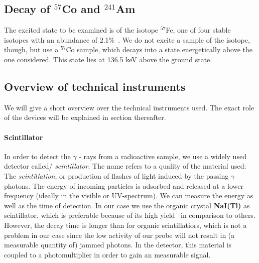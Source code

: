 \subsection{Decay of $^{57}$Co and $^{241}$Am}
The excited state to be examined is of the isotope $^{57}$Fe, one of four stable isotopes 
with an abundance of 2.1\%~\cite{nist}. We do not excite a sample of the isotope, though, but 
use a $^{57}$Co sample, which decays into a state energetically above the one considered. 
This state lies at 136.5 keV above the ground state. 



\subsection{Overview of technical instruments}
We will give a short overview over the technical instruments used. The exact role 
of the devices will be explained in section thereafter.
\label{sub:overview_of_technical_instruments}
\paragraph{Scintillator}
In order to detect the $\gamma$ - rays from a radioactive sample, we use a widely used detector called/
\emph{scintillator}. The name refers to a quality of the material used: The \emph{scintillation}, or production 
of flashes of light induced by the passing $\gamma$ photons. 
The energy of incoming particles
is adsorbed and released at a lower frequency (ideally in the visible or UV-spectrum). 
We can measure the energy as well as the time of detection. 
In our case we use the organic crystal \textbf{NaI(Tl)} as scintillator, which
is preferable because of its high yield~\cite{ver} in comparison to others. However, the decay time is longer
than for organic scintillatiors, which is not a problem in our case since the low activity of our probe will
not result in (a measurable quantity of) jammed photons.
In the detector, this material is coupled to a photomultiplier in order
to gain an measurable signal. 

